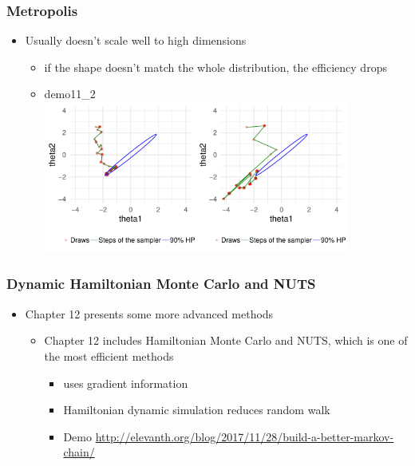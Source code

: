 \documentclass[10pt]{beamer}
\begin{document}
\begin{frame}

\frametitle{ Metropolis}

  \begin{itemize}
  \item Usually doesn't scale well to high dimensions
    \begin{itemize}
    \item if the shape doesn't match the whole distribution, the efficiency drops
    \item demo11\_2\\
      \vspace{1\baselineskip}
      \hspace{-1cm}\includegraphics[width=5cm]{figs/Metrop2.pdf}\includegraphics[width=5cm]{figs/Metrop3.pdf}
    \end{itemize}
  \end{itemize}

\end{frame}


\begin{frame}

\frametitle{ Dynamic Hamiltonian Monte Carlo and NUTS}

  \begin{itemize}
  \item Chapter 12 presents some more advanced methods
    \begin{itemize}
    \item Chapter 12 includes Hamiltonian Monte Carlo and NUTS, which
      is one of the most efficient methods
      \begin{itemize}
      \item uses gradient information
      \item Hamiltonian dynamic simulation reduces random walk
   \item Demo {\small \url{http://elevanth.org/blog/2017/11/28/build-a-better-markov-chain/}}
      \end{itemize}
    \end{itemize}
  \end{itemize}

\end{frame}
\end{document}
